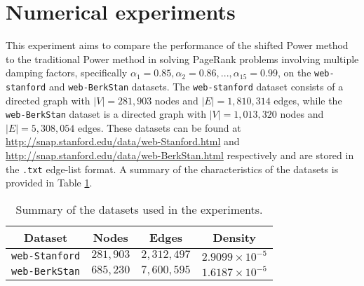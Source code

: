 
\section{Numerical experiments}\label{sec:exp}

This experiment aims to compare the performance of the shifted Power method to the traditional Power method in solving PageRank problems involving multiple damping factors, specifically ${ \alpha_1 = 0.85, \alpha_2 = 0.86, ... , \alpha_{15} = 0.99 }$, on the \texttt{web-stanford} and \texttt{web-BerkStan} datasets. The \texttt{web-stanford} dataset consists of a directed graph with $|V| = 281,903$ nodes and $|E| = 1,810,314$ edges, while the \texttt{web-BerkStan} dataset is a directed graph with $|V| = 1, 013, 320$ nodes and $|E| = 5, 308, 054$ edges. These datasets can be found at \url{http://snap.stanford.edu/data/web-Stanford.html} and \url{http://snap.stanford.edu/data/web-BerkStan.html} respectively and are stored in the \texttt{.txt} edge-list format. A summary of the characteristics of the datasets is provided in Table \ref{tab:datasets}.

\begin{table}[h]
\centering
\begin{tabular}{|c|c|c|c|}
\hline
\textbf{Dataset} & \textbf{Nodes} & \textbf{Edges} & \textbf{Density} \\ \hline
\texttt{web-Stanford} & $281,903$ & $2,312,497$ & $2.9099 \times 10^{-5}$ \\ \hline
\texttt{web-BerkStan} & $685,230$ & $7,600,595$ & $1.6187 \times 10^{-5}$ \\ \hline
\end{tabular}
\caption{Summary of the datasets used in the experiments.}
\label{tab:datasets}
\end{table}

